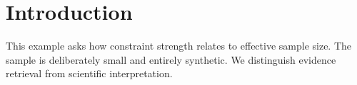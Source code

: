 \section{Introduction}
This example asks how constraint strength relates to effective sample size.
The sample is deliberately small and entirely synthetic.
We distinguish evidence retrieval from scientific interpretation.
